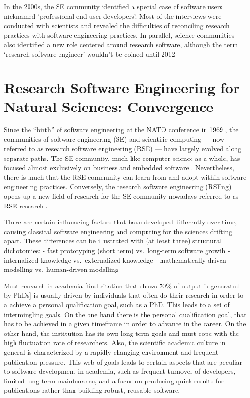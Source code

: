 \documentclass[
        twocolumn,german,biblatex
    ]{article}
\begin{document}
    In the 2000s, the SE community identified a special case of software
    users nicknamed `professional end-user
    developers'\autocite{Segal2005,Segal2007,Segal2009b}. Most of the
    interviews were conducted with scientists and revealed the
    difficulties of reconciling research practices with software
    engineering
    practices\autocite{Segal2005,Segal2009,Lawrence2006,Wood2003,Storer2017}.
    In parallel, science communities also identified a new role centered
    around research software\autocite{Baxter2006}, although the term
    `research software engineer' wouldn't be coined until
    2012\autocite{Baxter2012}.

    \section{Research Software Engineering for Natural Sciences:
    Convergence}\label{research-software-engineering-for-natural-sciences-convergence}

    Since the ``birth'' of software engineering at the NATO conference
    in 1969 \autocite{Naur1969}, the communities of software engineering
    (SE) and scientific computing --- now referred to as research
    software engineering (RSE) --- have largely evolved along separate
    paths. The SE community, much like computer science as a whole, has
    focused almost exclusively on business and embedded software
    \autocite{Johanson2018}. Nevertheless, there is much that the RSE
    community can learn from and adopt within software engineering
    practices. Conversely, the research software engineering (RSEng)
    opens up a new field of research for the SE community nowadays
    referred to as RSE research \autocite{Felderer2025}.

    There are certain influencing factors that have developed
    differently over time, causing classical software engineering and
    computing for the sciences drifting apart. These differences can be
    illustrated with (at least three) structural dichotomies: - fast
    prototyping (short term) vs.~long-term software growth -
    internalized knowledge vs.~externalized knowledge -
    mathematically-driven modelling vs.~human-driven modelling

    Most research in academia {[}find citation that shows 70\% of output
    is generated by PhDs{]} is usually driven by individuals that often
    do their research in order to a achieve a personal qualification
    goal, such as a PhD. This leads to a set of intermingling goals. On
    the one hand there is the personal qualification goal, that has to
    be achieved in a given timeframe in order to advance in the career.
    On the other hand, the institution has its own long-term goals and
    must cope with the high fluctuation rate of researchers. Also, the
    scientific academic culture in general is characterized by a rapidly
    changing environment and frequent publication pressure. This web of
    goals leads to certain aspects that are peculiar to software
    development in academia, such as frequent turnover of developers,
    limited long-term maintenance, and a focus on producing quick
    results for publications rather than building robust, reusable
    software.
\end{document}
